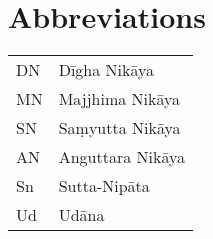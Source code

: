 \chapter*{Abbreviations}

\begin{tabular}{l l}
DN & Dīgha Nikāya\\
MN & Majjhima Nikāya\\
SN & Saṃyutta Nikāya\\
AN & Anguttara Nikāya\\
Sn & Sutta-Nipāta\\
Ud & Udāna\\
\end{tabular}
